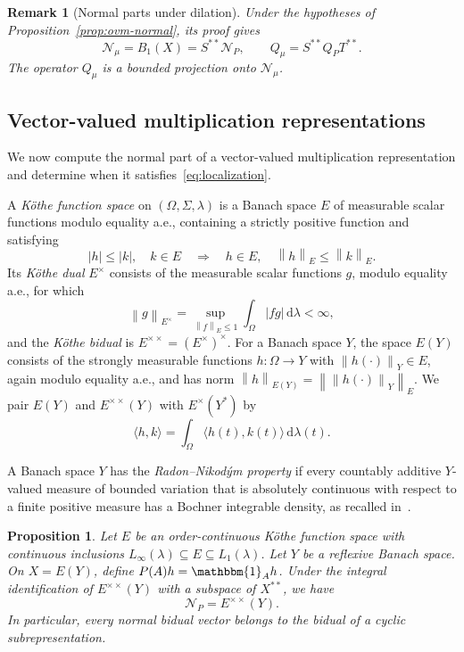 \documentclass[11pt,leqno]{amsart}
\theoremstyle{compact}
\numberwithin{equation}{section}
\newtheorem{proposition}[theorem]{Proposition}
\theoremstyle{compactremark}
\newtheorem{remark}[theorem]{Remark}
\theoremstyle{compact}
\newcommand{\1}{\mathbbm{1}}
\newcommand{\rmd}{\mathrm{d}}
\newcommand{\norm}[1]{\left\|#1\right\|}
\newcommand{\abs}[1]{\left|#1\right|}
\newcommand{\inp}[2]{\langle #1,#2\rangle}
\begin{document}
\begingroup
\begin{remark}[Normal parts under dilation]\label{rem:ovm-normal-transfer}
Under the hypotheses of Proposition~\ref{prop:ovm-normal}, its proof gives
\[
\mathcal N_\mu=B_1(X)=S^{**}\mathcal N_P,\qquad Q_\mu=S^{**}Q_PT^{**}.
\]
The operator $Q_\mu$ is a bounded projection onto $\mathcal N_\mu$.
\end{remark}
\par\endgroup

\subsection[Vector-valued multiplication representations]{Vector-valued multiplication representations}

We now compute the normal part of a vector-valued multiplication representation and determine when it satisfies~\eqref{eq:localization}.

\begingroup
A \emph{K\"othe function space} on $(\Omega,\Sigma,\lambda)$ is a Banach space $E$ of measurable scalar functions modulo equality a.e., containing a strictly positive function and satisfying
\[
\abs{h}\leq\abs{k},\quad k\in E\quad\Longrightarrow\quad h\in E,\quad\norm{h}_E\leq\norm{k}_E.
\]
Its \emph{K\"othe dual} $E^\times$ consists of the measurable scalar functions $g$, modulo equality a.e., for which
\[
\norm{g}_{E^\times}=\sup_{\norm{f}_E\leq1}\int_\Omega\abs{fg}\,\rmd\lambda<\infty,
\]
and the \emph{K\"othe bidual} is $E^{\times\times}=(E^\times)^\times$. For a Banach space $Y$, the space $E(Y)$ consists of the strongly measurable functions $h\colon\Omega\to Y$ with $\norm{h(\cdot)}_Y\in E$, again modulo equality a.e., and has norm $\norm{h}_{E(Y)}=\norm{\norm{h(\cdot)}_Y}_E$. We pair $E(Y)$ and $E^{\times\times}(Y)$ with $E^\times(Y^*)$ by
\[
\inp{h}{k}=\int_\Omega\inp{h(t)}{k(t)}\,\rmd\lambda(t).
\]

A Banach space $Y$ has the \emph{Radon--Nikod\'ym property} if every countably additive $Y$-valued measure of bounded variation that is absolutely continuous with respect to a finite positive measure has a Bochner integrable density, as recalled in~\cite[Chapter~III]{DiestelUhl1977}.

\begin{proposition}\label{prop:bochner-normal}
Let $E$ be an order-continuous K\"othe function space with continuous inclusions $L_\infty(\lambda)\subseteq E\subseteq L_1(\lambda)$. Let $Y$ be a reflexive Banach space. On $X=E(Y)$, define $P(A)h=\1_Ah$. Under the integral identification of $E^{\times\times}(Y)$ with a subspace of $X^{**}$, we have
\[
\mathcal N_P=E^{\times\times}(Y).
\]
In particular, every normal bidual vector belongs to the bidual of a cyclic subrepresentation.
\end{proposition}
\end{document}
